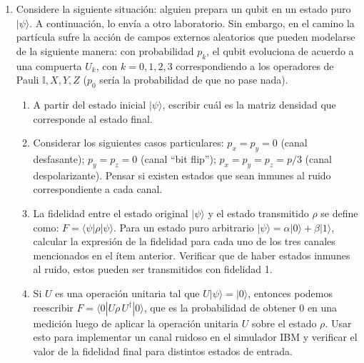 \documentclass[a4paper,11pt,spanish]{article}
\newcommand{\ket}[1]{|#1\rangle}
\newcommand{\bra}[1]{\langle #1|}
\begin{document}
\begin{enumerate}
\begin{enumerate}
     \item Tomamos otro tercio de los qubits originales y les aplicamos una compuerta $H$. Mostrar c\'omo al medir estos qubits en el estado $\tilde\rho= H\rho H$ podemos estimar el valor de $a_x$.
     
     \item Explicar cuáles serían los pasos para estimar el valor de $a_y$ en forma an\'aloga al \'item pasado, realizando alguna medición sobre el tercio de qubits que nos queda.
    \end{enumerate}

    \item Considere la siguiente situación: alguien prepara un qubit en un estado puro $\ket{\psi}$. A
continuación, lo envía a otro laboratorio. Sin embargo, en el camino la partícula sufre la acción de
campos externos aleatorios que pueden modelarse de la siguiente manera: con
probabilidad $p_k$, el qubit evoluciona de acuerdo a una compuerta $U_k$, con $k = 0, 1, 2, 3$ correspondiendo a los operadores de Pauli $\mathbb{I}, X, Y, Z$ ($p_0$ ser\'ia la probabilidad de que no pase nada).

\begin{enumerate}
 \item A partir del estado inicial $\ket{\psi}$, escribir cuál es la matriz densidad que corresponde al estado final.
 \item Considerar los siguientes casos particulares: $p_x = p_y = 0$ (canal desfasante); $p_y = p_z = 0$ (canal ``bit flip''); $p_x = p_y = p_z=p/3$ (canal despolarizante). Pensar si existen estados que sean inmunes al ruido correspondiente a cada canal.
 \item La fidelidad entre el estado original $\ket{\psi}$ y el estado transmitido $\rho$ se define como:
 $F = \bra{\psi} \rho \ket{\psi}$. Para un estado puro arbitrario $\ket{\psi}=\alpha\ket{0}+\beta\ket{1}$, calcular la expresi\'on de la fidelidad para cada uno de los tres canales mencionados en el \'item anterior. Verificar que de haber estados inmunes al ruido, estos pueden ser transmitidos con fidelidad 1.
 \item Si $U$ es una operaci\'on unitaria tal que $U\ket{\psi}=\ket{0}$, entonces podemos reescribir $F = \bra{0} U \rho\, U^\dagger \ket{0}$, que es la probabilidad de obtener 0 en una medici\'on luego de aplicar la operaci\'on unitaria $U$ sobre el estado $\rho$. Usar esto para implementar un canal ruidoso en el simulador IBM y verificar el valor de la fidelidad final para distintos estados de entrada.
\end{enumerate}


\end{enumerate}
\end{document}
